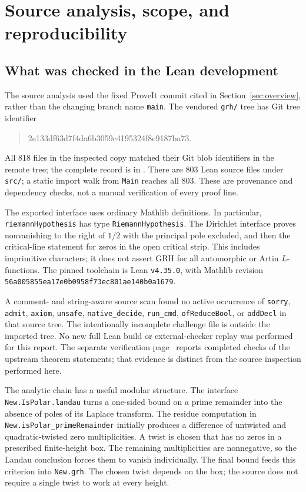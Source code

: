 \section{Source analysis, scope, and reproducibility}
\label{sec:provenance}

\subsection{What was checked in the Lean development}

The source analysis used the fixed ProveIt commit cited in
Section~\ref{sec:overview}, rather than the changing branch name
\texttt{main}. The vendored \texttt{grh/} tree has Git tree identifier
\begin{quote}\small\ttfamily
2e133df63d7f4da6b3059c4195324f8e9187ba73.
\end{quote}
All 818 files in
the inspected copy matched their Git blob identifiers in the remote
tree; the complete record is in .
There are 803 Lean source files under \texttt{src/}; a static
import walk from \texttt{Main} reaches all 803. These are provenance
and dependency checks, not a manual verification of every proof line.

The exported interface uses ordinary Mathlib definitions. In
particular, \texttt{riemannHypothesis} has type
\texttt{RiemannHypothesis}. The Dirichlet interface proves nonvanishing
to the right of $1/2$ with the principal pole excluded, and then the
critical-line statement for zeros in the open critical strip. This
includes imprimitive characters; it does not assert GRH for all
automorphic or Artin $L$-functions. The pinned toolchain is Lean
\texttt{v4.35.0}, with Mathlib revision
\texttt{56a005855ea17e0b0958f73ec801ae140b0a1679}.

A comment- and string-aware source scan found no active occurrence of
\texttt{sorry}, \texttt{admit}, \texttt{axiom}, \texttt{unsafe},
\texttt{native\_decide}, \texttt{run\_cmd},
\texttt{ofReduceBool}, or \texttt{addDecl} in that source tree.
The intentionally incomplete challenge file is outside the imported
tree. No new full Lean build or external-checker replay was performed
for this report. The separate verification page~\cite{Sutherland}
reports completed checks of the upstream theorem statements; that
evidence is distinct from the source inspection performed here.

The analytic chain has a useful modular structure. The interface
\texttt{New.IsPolar.landau} turns a one-sided bound on a prime
remainder into the absence of poles of its Laplace transform. The
residue computation in
\texttt{New.isPolar\_primeRemainder} initially produces a difference
of untwisted and quadratic-twisted zero multiplicities. A twist is
chosen that has no zeros in a prescribed finite-height box. The
remaining multiplicities are nonnegative, so the Landau conclusion
forces them to vanish individually. The final bound feeds this
criterion into \texttt{New.grh}. The chosen twist depends on the
box; the source does not require a single twist to work at every
height.

